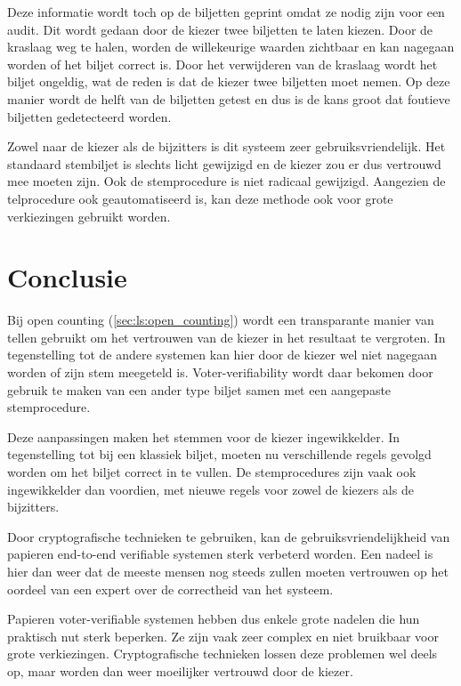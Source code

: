 \npar Deze informatie wordt toch op de biljetten geprint omdat ze nodig zijn voor een audit. Dit wordt gedaan door de kiezer twee biljetten te laten kiezen. Door de kraslaag weg te halen, worden de willekeurige waarden zichtbaar en kan nagegaan worden of het biljet correct is. Door het verwijderen van de kraslaag wordt het biljet ongeldig, wat de reden is dat de kiezer twee biljetten moet nemen. Op deze manier wordt de helft van de biljetten getest en dus is de kans groot dat foutieve biljetten gedetecteerd worden.

\npar Zowel naar de kiezer als de bijzitters is dit systeem zeer gebruiksvriendelijk. Het standaard stembiljet is slechts licht gewijzigd en de kiezer zou er dus vertrouwd mee moeten zijn. Ook de stemprocedure is niet radicaal gewijzigd. Aangezien de telprocedure ook geautomatiseerd is, kan deze methode ook voor grote verkiezingen gebruikt worden.

\section{Conclusie}
\label{sec:ls:conclusie}

Bij open counting (\ref{sec:ls:open_counting}) wordt een transparante manier van tellen gebruikt om het vertrouwen van de kiezer in het resultaat te vergroten. In tegenstelling tot de andere systemen kan hier door de kiezer wel niet nagegaan worden of zijn stem meegeteld is. Voter-verifiability wordt daar bekomen door gebruik te maken van een ander type biljet samen met een aangepaste stemprocedure.

\npar Deze aanpassingen maken het stemmen voor de kiezer ingewikkelder. In tegenstelling tot bij een klassiek biljet, moeten nu verschillende regels gevolgd worden om het biljet correct in te vullen. De stemprocedures zijn vaak ook ingewikkelder dan voordien, met nieuwe regels voor zowel de kiezers als de bijzitters.

\npar Door cryptografische technieken te gebruiken, kan de gebruiksvriendelijkheid van papieren end-to-end verifiable systemen sterk verbeterd worden. Een nadeel is hier dan weer dat de meeste mensen nog steeds zullen moeten vertrouwen op het oordeel van een expert over de correctheid van het systeem.

\npar Papieren voter-verifiable systemen hebben dus enkele grote nadelen die hun praktisch nut sterk beperken. Ze zijn vaak zeer complex en niet bruikbaar voor grote verkiezingen. Cryptografische technieken lossen deze problemen wel deels op, maar worden dan weer moeilijker vertrouwd door de kiezer.
